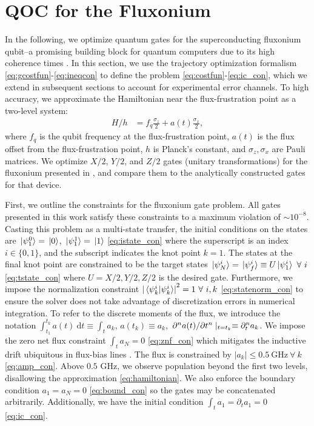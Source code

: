 \section{QOC for the Fluxonium \label{sec:fluxonium}}
In the following, we optimize quantum gates
for the superconducting fluxonium qubit--a promising
building block for quantum computers due to its high
coherence times
\cite{earnest2018realization, lin2018demonstration,
  manucharyan2009fluxonium, nguyen2019high,
  zhang2020universal}.
In this section, we use the trajectory optimization
formalism \eqref{eq:gcostfun}-\eqref{eq:ineqcon}
to define the problem \eqref{eq:costfun}-\eqref{eq:ic_con},
which we extend in subsequent sections to account
for experimental error channels.
To high accuracy, we approximate the Hamiltonian near the flux-frustration
point as a two-level system:
\begin{align}
  H/h &= f_{q} \frac{\sigma_{z}}{2} + a(t) \frac{\sigma_{x}}{2},
  \label{eq:hamiltonian}
\end{align}
where $f_{q}$ is the qubit frequency at the flux-frustration point,
$a(t)$ is the flux offset from the flux-frustration point,
$h$ is Planck's constant, and $\sigma_{z}, \sigma_{x}$
are Pauli matrices. We optimize $X/2$,
$Y/2$, and $Z/2$ gates (unitary transformations)
for the fluxonium presented in \cite{zhang2020universal},
and compare them to the analytically constructed gates for
that device.

First, we outline the constraints for the fluxonium gate problem.
All gates presented in this work satisfy these constraints to
a maximum violation of $\sim 10^{-8}$.
Casting this problem as a multi-state transfer, the initial conditions on
the states are $\ket*{\psi^{0}_{1}} = \ket*{0}$, $\ket*{\psi^{1}_{1}} = \ket*{1}$
\eqref{eq:istate_con}
where the superscript is an index $i \in \{0, 1\}$,
and the subscript indicates the knot point $k = 1$.
The states at the final knot point are constrained to be
the target states $\ket*{\psi^{i}_{N}} = \ket*{\psi^{i}_{f}} \equiv U
\ket*{\psi^{i}_{1}} \ \forall \ i$
\eqref{eq:tstate_con} where $U = X/2, Y/2, Z/2$ is the desired gate.
Furthermore, we impose the normalization constraint
${\lvert \braket*{\psi^{i}_{k}}{\psi^{i}_{k}} \rvert}^{2} = 1 \ \forall \ i,k$
\eqref{eq:statenorm_con}
to ensure the solver does not take advantage of discretization errors in numerical integration.
To refer to the discrete moments of the flux, we introduce the notation
$\int^{t_{k}}_{t_{1}} a(t) \ \mathrm{d}t \equiv \int_{t} a_{k}$,
$a(t_{k}) \equiv a_{k}$,
$\pdv*[n]{a(t)}{t} \lvert_{t = t_{k}} \equiv \partial^{n}_{t} a_{k}$.
We impose the zero net flux constraint $\int_{t} a_{N} = 0$
\eqref{eq:znf_con}
which mitigates the inductive drift ubiquitous in flux-bias lines
\cite{battistel2019fast, krantz2019quantum, zhang2020universal}.
The flux is constrained by $\lvert a_{k} \rvert \leq 0.5 \ \textrm{GHz} \ \forall \ k$
\eqref{eq:amp_con}.
Above $0.5$ GHz, we observe population beyond the first two levels, disallowing the
approximation \eqref{eq:hamiltonian}.
We also enforce the boundary condition $a_{1} = a_{N} = 0$ \eqref{eq:bound_con}
so the gates may be concatenated arbitrarily. Additionally,
we have the initial condition $\int_{t} a_{1} = \partial_{t} a_{1} = 0$
\eqref{eq:ic_con}.


